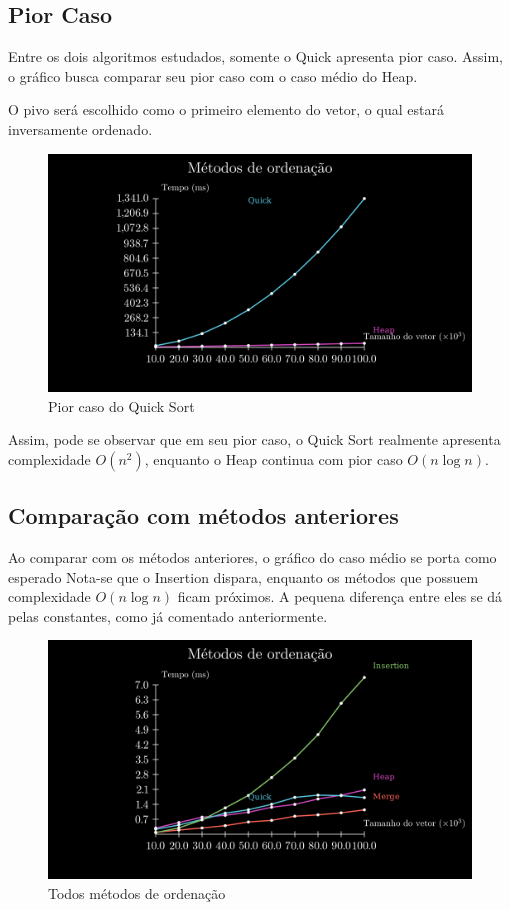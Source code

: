 \documentclass[fontsize=11pt]{article}
\begin{document}
  \subsection{Pior Caso}
    Entre os dois algoritmos estudados, somente o Quick apresenta pior
    caso. Assim, o gráfico busca comparar seu pior caso com o caso médio
    do Heap.
    
    O pivo será escolhido como o primeiro elemento do vetor, o qual estará
    inversamente ordenado.
    \begin{figure}[H]
      \includegraphics[width=\textwidth]{quickWorse.png} 
      \caption{Pior caso do Quick Sort}
      \label{fig:worse}
    \end{figure}
    Assim, pode se observar que em seu pior caso, o Quick Sort realmente  apresenta complexidade $O(n^2)$, enquanto o Heap continua com pior caso
    $O(n \log n)$.
  \subsection{Comparação com métodos anteriores}
    Ao comparar com os métodos anteriores, o gráfico do caso médio se porta como esperado
    Nota-se que o Insertion dispara, enquanto os métodos que possuem complexidade $O(n\log n)$
    ficam próximos. A pequena diferença entre eles se dá pelas constantes, como já comentado
    anteriormente.
    \begin{figure}[H]
      \includegraphics[width=\textwidth]{allgraphs.png} 
      \caption{Todos métodos de ordenação}
      \label{fig:all}
    \end{figure}
\end{document}
